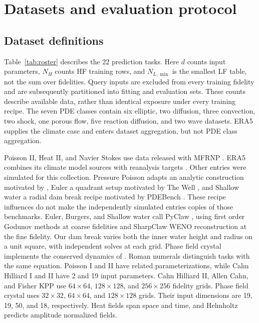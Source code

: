 \section{Datasets and evaluation protocol}
\label{app:roster}
\subsection{Dataset definitions}
Table~\ref{tab:roster} describes the 22 prediction tasks. Here $d$ counts input
parameters, $N_H$ counts HF training rows, and $N_{L,\min}$ is the smallest LF
table, not the sum over fidelities. Query inputs are excluded from every
training fidelity and are subsequently partitioned into fitting and evaluation
sets. These counts describe available data, rather than identical exposure
under every training recipe. The seven PDE classes contain six elliptic,
two diffusion, three convection, two shock, one porous flow, five reaction
diffusion, and two wave datasets. ERA5 supplies the climate case and enters
dataset aggregation, but not PDE class aggregation.

\begin{table}[h!]
\centering\footnotesize\setlength{\tabcolsep}{3pt}
\caption{\textbf{Dataset definitions and available training data.} Query counts
include fitting pools and evaluation cases. Work grids are used for prediction
and scoring. Citations identify imported data, while uncited entries use our
simulation code.}
\label{tab:roster}\resizebox{\linewidth}{!}{}
\end{table}

Poisson II, Heat II, and Navier Stokes use data released with MFRNP
\citep{niu2024}. ERA5 combines its climate model sources with reanalysis targets
\citep{hersbach2020,niu2024}. Other entries were simulated for this collection.
Pressure Poisson adapts an analytic construction motivated by \citet{partin2022},
Euler a quadrant setup motivated by The Well \citep{ohana2024}, and Shallow
water a radial dam break recipe motivated by PDEBench \citep{takamoto2022}.
These recipe influences do not make the independently simulated entries copies
of those benchmarks. Euler, Burgers, and Shallow water call PyClaw
\citep{ketcheson2012pyclaw}, using first order Godunov methods at coarse
fidelities and SharpClaw WENO reconstruction at the fine fidelity. Our dam
break varies both the inner water height and radius on a unit square, with
independent solves at each grid. Phase field crystal implements the conserved
dynamics of \citet{elder2004}. Roman numerals distinguish tasks with the same equation.
Poisson I and II have related parameterizations, while Cahn Hilliard I and II
have 2 and 19 input parameters. Cahn Hilliard II, Allen Cahn, and Fisher KPP use
$64\times64$, $128\times128$, and $256\times256$ fidelity grids. Phase field
crystal uses $32\times32$, $64\times64$, and $128\times128$ grids. Their input
dimensions are 19, 19, 50, and 18, respectively. Heat fields span space and
time, and Helmholtz predicts amplitude normalized fields.

